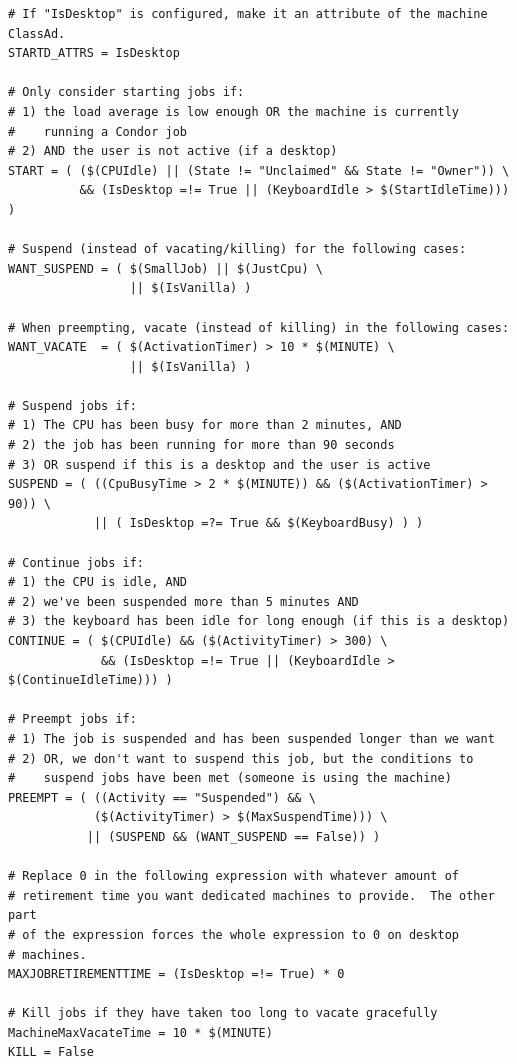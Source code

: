 \begin{verbatim}
# If "IsDesktop" is configured, make it an attribute of the machine ClassAd.
STARTD_ATTRS = IsDesktop

# Only consider starting jobs if:
# 1) the load average is low enough OR the machine is currently
#    running a Condor job
# 2) AND the user is not active (if a desktop)
START = ( ($(CPUIdle) || (State != "Unclaimed" && State != "Owner")) \
          && (IsDesktop =!= True || (KeyboardIdle > $(StartIdleTime))) )

# Suspend (instead of vacating/killing) for the following cases:
WANT_SUSPEND = ( $(SmallJob) || $(JustCpu) \
                 || $(IsVanilla) )

# When preempting, vacate (instead of killing) in the following cases:
WANT_VACATE  = ( $(ActivationTimer) > 10 * $(MINUTE) \
                 || $(IsVanilla) )

# Suspend jobs if:
# 1) The CPU has been busy for more than 2 minutes, AND
# 2) the job has been running for more than 90 seconds
# 3) OR suspend if this is a desktop and the user is active
SUSPEND = ( ((CpuBusyTime > 2 * $(MINUTE)) && ($(ActivationTimer) > 90)) \
            || ( IsDesktop =?= True && $(KeyboardBusy) ) )

# Continue jobs if:
# 1) the CPU is idle, AND 
# 2) we've been suspended more than 5 minutes AND
# 3) the keyboard has been idle for long enough (if this is a desktop)
CONTINUE = ( $(CPUIdle) && ($(ActivityTimer) > 300) \
             && (IsDesktop =!= True || (KeyboardIdle > $(ContinueIdleTime))) )

# Preempt jobs if:
# 1) The job is suspended and has been suspended longer than we want
# 2) OR, we don't want to suspend this job, but the conditions to
#    suspend jobs have been met (someone is using the machine)
PREEMPT = ( ((Activity == "Suspended") && \
            ($(ActivityTimer) > $(MaxSuspendTime))) \
           || (SUSPEND && (WANT_SUSPEND == False)) )

# Replace 0 in the following expression with whatever amount of
# retirement time you want dedicated machines to provide.  The other part
# of the expression forces the whole expression to 0 on desktop
# machines.
MAXJOBRETIREMENTTIME = (IsDesktop =!= True) * 0

# Kill jobs if they have taken too long to vacate gracefully
MachineMaxVacateTime = 10 * $(MINUTE)
KILL = False

\end{verbatim}

